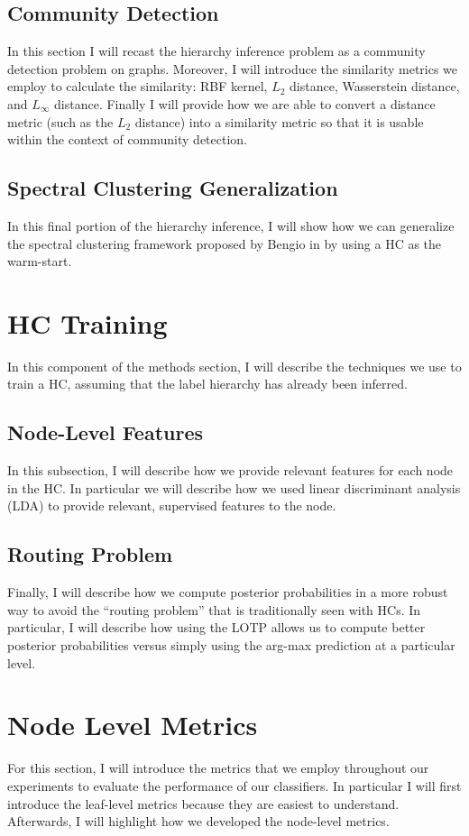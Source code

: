 \documentclass[../thesis.tex]{subfiles}
\begin{document}
\subsection{Community Detection}
In this section I will recast the hierarchy inference problem as a community detection problem on graphs. Moreover, I will introduce the similarity metrics we employ to calculate the similarity: RBF kernel, $L_2$ distance, Wasserstein distance, and $L_\infty$ distance. Finally I will provide how we are able to convert a distance metric (such as the $L_2$ distance) into a similarity metric so that it is usable within the context of community detection.

\subsection{Spectral Clustering Generalization}
In this final portion of the hierarchy inference, I will show how we can generalize the spectral clustering framework proposed by Bengio in \cite{bengio2010label} by using a HC as the warm-start.

\section{HC Training}
In this component of the methods section, I will describe the techniques we use to train a HC, assuming that the label hierarchy has already been inferred.

\subsection{Node-Level Features}
In this subsection, I will describe how we provide relevant features for each node in the HC. In particular we will describe how we used linear discriminant analysis (LDA) to provide relevant, supervised features to the node.

\subsection{Routing Problem}
Finally, I will describe how we compute posterior probabilities in a more robust way to avoid the ``routing problem'' that is traditionally seen with HCs. In particular, I will describe how using the LOTP allows us to compute better posterior probabilities versus simply using the arg-max prediction at a particular level. 

\section{Node Level Metrics}
For this section, I will introduce the metrics that we employ throughout our experiments to evaluate the performance of our classifiers. In particular I will first introduce the leaf-level metrics because they are easiest to understand. Afterwards, I will highlight how we developed the node-level metrics.
\end{document}
